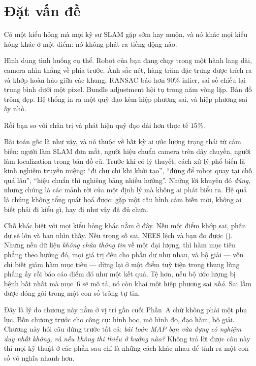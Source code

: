 \documentclass[../../vslam.tex]{subfiles}
\begin{document}
\section{Đặt vấn đề}

Có một kiểu hỏng mà mọi kỹ sư SLAM gặp sớm hay muộn, và nó khác mọi kiểu hỏng khác ở một điểm: nó không phát ra tiếng động nào.

Hình dung tình huống cụ thể. Robot của bạn đang chạy trong một hành lang dài, camera nhìn thẳng về phía trước. Ảnh sắc nét, hàng trăm đặc trưng được trích ra và khớp hoàn hảo giữa các khung, RANSAC báo hơn \(90\%\) inlier, sai số chiếu lại trung bình dưới một pixel. Bundle adjustment hội tụ trong năm vòng lặp. Bản đồ trông đẹp. Hệ thống in ra một quỹ đạo kèm hiệp phương sai, và hiệp phương sai ấy nhỏ.

Rồi bạn so với chân trị và phát hiện quỹ đạo dài hơn thực tế \(15\%\).

Bài toán gốc là như vậy, và nó thuộc về bất kỳ ai ước lượng trạng thái từ cảm biến: người làm SLAM đơn mắt, người hiệu chuẩn camera trên dây chuyền, người làm localization trong bản đồ cũ. Trước khi có lý thuyết, cách xử lý phổ biến là kinh nghiệm truyền miệng: ``đi chữ chi khi khởi tạo'', ``đừng để robot quay tại chỗ quá lâu'', ``hiệu chuẩn thì nghiêng bảng nhiều hướng''. Những lời khuyên đó \emph{đúng}, nhưng chúng là các mảnh rời của một định lý mà không ai phát biểu ra. Hệ quả là chúng không tổng quát hoá được: gặp một cấu hình cảm biến mới, không ai biết phải đi kiểu gì, hay đi như vậy đã đủ chưa.

Chỗ khác biệt với mọi kiểu hỏng khác nằm ở đây. Nếu một điểm khớp sai, phần dư sẽ lớn và bạn nhìn thấy. Nếu trọng số sai, NEES lệch và bạn đo được (). Nhưng nếu dữ liệu \emph{không chứa thông tin} về một đại lượng, thì hàm mục tiêu phẳng theo hướng đó, mọi giá trị đều cho phần dư như nhau, và bộ giải --- vốn chỉ biết giảm hàm mục tiêu --- dừng lại ở một điểm tuỳ tiện trong thung lũng phẳng ấy rồi báo cáo điểm đó như một kết quả. Tệ hơn, nếu bộ ước lượng bị bệnh bất nhất mà mục~6 sẽ mô tả, nó còn khai một hiệp phương sai \emph{nhỏ}. Sai lầm được đóng gói trong một con số trông tự tin.

Đây là lý do chương này nằm ở vị trí gần cuối Phần~A chứ không phải một phụ lục. Bốn chương trước cho công cụ: hình học, mô hình đo, đạo hàm, bộ giải. Chương này hỏi câu đứng trước tất cả: \emph{bài toán MAP bạn vừa dựng có nghiệm duy nhất không, và nếu không thì thiếu ở hướng nào?} Không trả lời được câu này thì mọi kỹ thuật ở các phần sau chỉ là những cách khác nhau để tính ra một con số vô nghĩa nhanh hơn.
\end{document}
